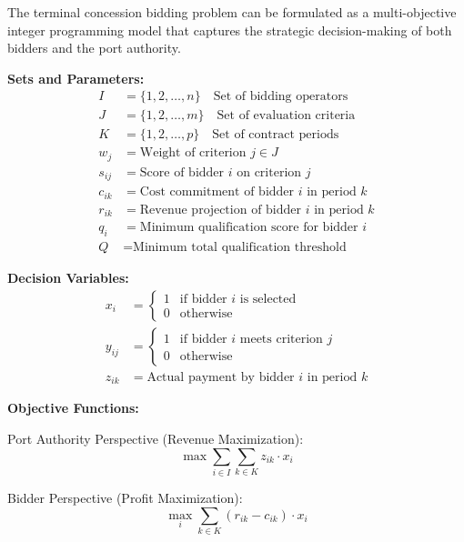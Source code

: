 \documentclass{article}
\begin{document}
The terminal concession bidding problem can be formulated as a multi-objective integer programming model that captures the strategic decision-making of both bidders and the port authority.

\textbf{Sets and Parameters:}
\begin{align}
I &= \{1, 2, \ldots, n\} \quad \text{Set of bidding operators} \\
J &= \{1, 2, \ldots, m\} \quad \text{Set of evaluation criteria} \\
K &= \{1, 2, \ldots, p\} \quad \text{Set of contract periods} \\
w_j &= \text{Weight of criterion } j \in J \\
s_{ij} &= \text{Score of bidder } i \text{ on criterion } j \\
c_{ik} &= \text{Cost commitment of bidder } i \text{ in period } k \\
r_{ik} &= \text{Revenue projection of bidder } i \text{ in period } k \\
q_{i} &= \text{Minimum qualification score for bidder } i \\
Q &= \text{Minimum total qualification threshold}
\end{align}

\textbf{Decision Variables:}
\begin{align}
x_i &= \begin{cases} 
1 & \text{if bidder } i \text{ is selected} \\
0 & \text{otherwise}
\end{cases} \\
y_{ij} &= \begin{cases} 
1 & \text{if bidder } i \text{ meets criterion } j \\
0 & \text{otherwise}
\end{cases} \\
z_{ik} &= \text{Actual payment by bidder } i \text{ in period } k
\end{align}

\textbf{Objective Functions:}

Port Authority Perspective (Revenue Maximization):
\begin{equation}
\max \sum_{i \in I} \sum_{k \in K} z_{ik} \cdot x_i
\end{equation}

Bidder Perspective (Profit Maximization):
\begin{equation}
\max_{i} \sum_{k \in K} (r_{ik} - c_{ik}) \cdot x_i
\end{equation}
\end{document}
